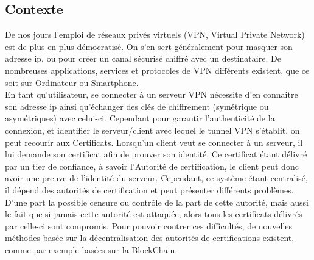 \documentclass[12pt, openany]{report}
\begin{document}
\subsection{Contexte}
\noindent 
\begin{flushleft}
De nos jours l'emploi de réseaux privés virtuels (VPN, Virtual Private Network) est de plus en plus démocratisé. On s'en sert généralement pour masquer son adresse ip, ou pour créer un canal sécurisé chiffré avec un destinataire. De nombreuses applications, services et protocoles de VPN différents existent, que ce soit sur Ordinateur ou Smartphone.\\
En tant qu'utilisateur, se connecter à un serveur VPN nécessite d'en connaitre son adresse ip ainsi qu'échanger des clés de chiffrement (symétrique ou asymétriques) avec celui-ci. Cependant pour garantir l'authenticité de la connexion, et identifier le serveur/client avec lequel le tunnel VPN s'établit, on peut recourir aux Certificats. Lorsqu'un client veut se connecter à un serveur, il lui demande son certificat afin de prouver son identité. Ce certificat étant délivré par un tier de confiance, à savoir l'Autorité de certification, le client peut donc avoir une preuve de l'identité du serveur. Cependant, ce système étant centralisé, il dépend des autorités de certification et peut présenter différents problèmes. D'une part la possible censure ou contrôle de la part de cette autorité, mais aussi le fait que si jamais cette autorité est attaquée, alors tous les certificats délivrés par celle-ci sont compromis. Pour pouvoir contrer ces difficultés, de nouvelles méthodes basée sur la décentralisation des autorités de certifications existent, comme par exemple basées sur la BlockChain.\\
\end{flushleft}
\end{document}

